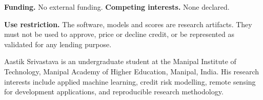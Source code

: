 \documentclass[journal]{IEEEtran}
\begin{document}
\textbf{Funding.} No external funding. \textbf{Competing interests.} None declared.

\textbf{Use restriction.} The software, models and scores are research artifacts. They must not be used to approve, price or decline credit, or be represented as validated for any lending purpose.

\balance



\begin{IEEEbiographynophoto}{Aastik Srivastava}
is an undergraduate student at the Manipal Institute of Technology, Manipal Academy of Higher Education, Manipal, India. His research interests include applied machine learning, credit risk modelling, remote sensing for development applications, and reproducible research methodology.
\end{IEEEbiographynophoto}
\end{document}
